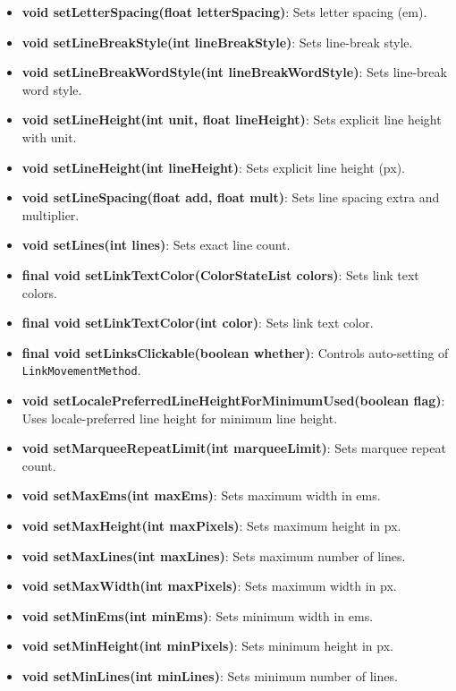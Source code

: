 \documentclass{report}
\begin{document}
\begin{itemize}
\begin{itemize}
                \item \textbf{void setLetterSpacing(float letterSpacing)}: Sets letter spacing (em).
                \item \textbf{void setLineBreakStyle(int lineBreakStyle)}: Sets line-break style.
                \item \textbf{void setLineBreakWordStyle(int lineBreakWordStyle)}: Sets line-break word style.
                \item \textbf{void setLineHeight(int unit, float lineHeight)}: Sets explicit line height with unit.
                \item \textbf{void setLineHeight(int lineHeight)}: Sets explicit line height (px).
                \item \textbf{void setLineSpacing(float add, float mult)}: Sets line spacing extra and multiplier.
                \item \textbf{void setLines(int lines)}: Sets exact line count.
                \item \textbf{final void setLinkTextColor(ColorStateList colors)}: Sets link text colors.
                \item \textbf{final void setLinkTextColor(int color)}: Sets link text color.
                \item \textbf{final void setLinksClickable(boolean whether)}: Controls auto-setting of \texttt{LinkMovementMethod}.
                \item \textbf{void setLocalePreferredLineHeightForMinimumUsed(boolean flag)}: Uses locale-preferred line height for minimum line height.
                \item \textbf{void setMarqueeRepeatLimit(int marqueeLimit)}: Sets marquee repeat count.
                \item \textbf{void setMaxEms(int maxEms)}: Sets maximum width in ems.
                \item \textbf{void setMaxHeight(int maxPixels)}: Sets maximum height in px.
                \item \textbf{void setMaxLines(int maxLines)}: Sets maximum number of lines.
                \item \textbf{void setMaxWidth(int maxPixels)}: Sets maximum width in px.
                \item \textbf{void setMinEms(int minEms)}: Sets minimum width in ems.
                \item \textbf{void setMinHeight(int minPixels)}: Sets minimum height in px.
                \item \textbf{void setMinLines(int minLines)}: Sets minimum number of lines.

\end{itemize}
\end{itemize}
\end{document}
